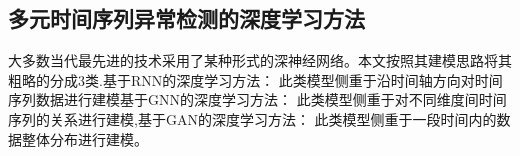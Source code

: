 \subsection{多元时间序列异常检测的深度学习方法}

大多数当代最先进的技术采用了某种形式的深神经网络。本文按照其建模思路将其粗略的分成3类.基于RNN的深度学习方法： 此类模型侧重于沿时间轴方向对时间序列数据进行建模基于GNN的深度学习方法： 此类模型侧重于对不同维度间时间序列的关系进行建模,基于GAN的深度学习方法： 此类模型侧重于一段时间内的数据整体分布进行建模。







